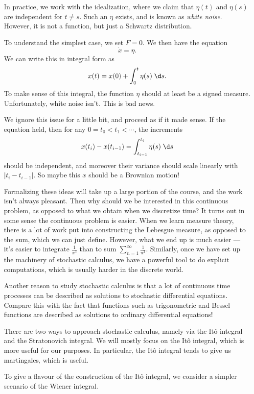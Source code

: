 \documentclass[a4paper]{article}
\begin{document}
In practice, we work with the idealization, where we claim that $\eta(t)$ and $\eta(s)$ are independent for $t \not= s$. Such an $\eta$ exists, and is known as \emph{white noise}. However, it is not a function, but just a Schwartz distribution.

To understand the simplest case, we set $F = 0$. We then have the equation
\[
  \dot{x} = \eta.
\]
We can write this in integral form as
\[
  x(t) = x(0) + \int_0^t \eta(s)\;\d s.
\]
To make sense of this integral, the function $\eta$ should at least be a signed measure. Unfortunately, white noise isn't. This is bad news.

We ignore this issue for a little bit, and proceed as if it made sense. If the equation held, then for any $0 = t_0 < t_1 < \cdots$, the increments
\[
  x(t_i) - x(t_{i - 1}) = \int_{t_{i - 1}}^{t_i} \eta(s) \;\d s
\]
should be independent, and moreover their variance should scale linearly with $|t_i - t_{i - 1}|$. So maybe this $x$ should be a Brownian motion!

Formalizing these ideas will take up a large portion of the course, and the work isn't always pleasant. Then why should we be interested in this continuous problem, as opposed to what we obtain when we discretize time? It turns out in some sense the continuous problem is easier. When we learn measure theory, there is a lot of work put into constructing the Lebesgue measure, as opposed to the sum, which we can just define. However, what we end up is much easier --- it's easier to integrate $\frac{1}{x^3}$ than to sum $\sum_{n = 1}^\infty \frac{1}{n^3}$. Similarly, once we have set up the machinery of stochastic calculus, we have a powerful tool to do explicit computations, which is usually harder in the discrete world.

Another reason to study stochastic calculus is that a lot of continuous time processes can be described as solutions to stochastic differential equations. Compare this with the fact that functions such as trigonometric and Bessel functions are described as solutions to ordinary differential equations!

There are two ways to approach stochastic calculus, namely via the It\^o integral and the Stratonovich integral. We will mostly focus on the It\^o integral, which is more useful for our purposes. In particular, the It\^o integral tends to give us martingales, which is useful.

To give a flavour of the construction of the It\^o integral, we consider a simpler scenario of the Wiener integral.
\end{document}
